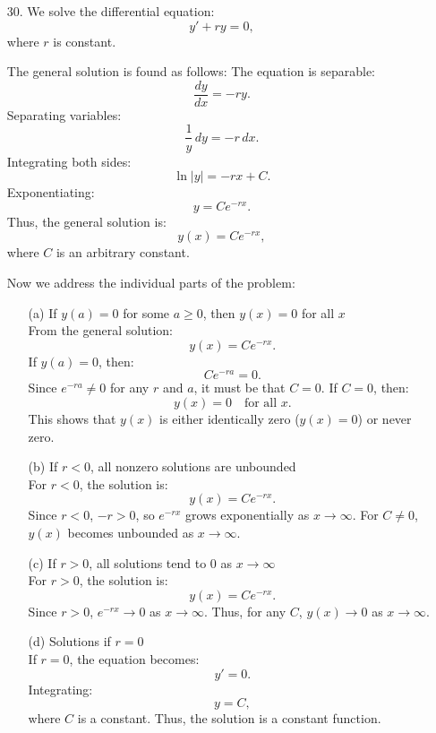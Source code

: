 \documentclass[12pt]{article}
\begin{document}
\begin{enumerate}
\item [30.]
We solve the differential equation:
\[
y' + ry = 0,
\]
where \( r \) is constant.

The general solution is found as follows:
The equation is separable:
\[
\frac{dy}{dx} = -ry.
\]
Separating variables:
\[
\frac{1}{y} \, dy = -r \, dx.
\]
Integrating both sides:
\[
\ln |y| = -rx + C.
\]
Exponentiating:
\[
y = Ce^{-rx}.
\]
Thus, the general solution is:
\[
y(x) = Ce^{-rx},
\]
where \( C \) is an arbitrary constant.

Now we address the individual parts of the problem:

\begin{enumerate}
    \item[(a)] If \( y(a) = 0 \) for some \( a \geq 0 \), then \( y(x) = 0 \) for all \( x \)\\
    From the general solution:
    \[
    y(x) = Ce^{-rx}.
    \]
    If \( y(a) = 0 \), then:
    \[
    C e^{-ra} = 0.
    \]
    Since \( e^{-ra} \neq 0 \) for any \( r \) and \( a \), it must be that \( C = 0 \). If \( C = 0 \), then:
    \[
    y(x) = 0 \quad \text{for all } x.
    \]
    This shows that \( y(x) \) is either identically zero (\( y(x) = 0 \)) or never zero.

    \item[(b)] If \( r < 0 \), all nonzero solutions are unbounded\\
    For \( r < 0 \), the solution is:
    \[
    y(x) = Ce^{-rx}.
    \]
    Since \( r < 0 \), \( -r > 0 \), so \( e^{-rx}\) grows exponentially as \( x \to \infty \). For \( C \neq 0 \), \( y(x) \) becomes unbounded as \( x \to \infty \).

    \item[(c)] If \( r > 0 \), all solutions tend to 0 as \( x \to \infty \)\\
    For \( r > 0 \), the solution is:
    \[
    y(x) = Ce^{-rx}.
    \]
    Since \( r > 0 \), \( e^{-rx} \to 0 \) as \( x \to \infty \). Thus, for any \( C \), \( y(x) \to 0 \) as \( x \to \infty \).

    \item[(d)] Solutions if \( r = 0 \)\\
    If \( r = 0 \), the equation becomes:
    \[
    y' = 0.
    \]
    Integrating:
    \[
    y = C,
    \]
    where \( C \) is a constant. Thus, the solution is a constant function.
\end{enumerate}


\end{enumerate}
\end{document}

